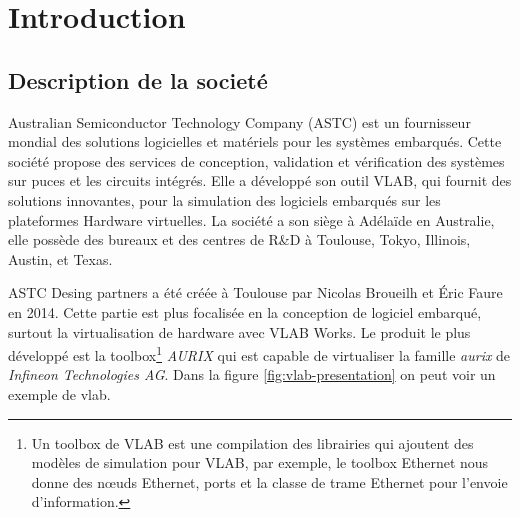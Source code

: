 \section{Introduction}

\subsection{Description de la societ\'e}
Australian Semiconductor Technology Company (ASTC) est un fournisseur mondial des solutions logicielles et matériels pour les systèmes embarqués. Cette société propose des services de conception, validation et vérification des systèmes sur puces et les circuits intégrés. Elle a développé son outil VLAB, qui fournit des solutions innovantes, pour la simulation des logiciels embarqués sur les plateformes Hardware virtuelles. La société a son siège à Adélaïde en Australie, elle possède des bureaux et des centres de R\&D à Toulouse, Tokyo, Illinois, Austin, et Texas.  

ASTC Desing partners a été créée à Toulouse par Nicolas Broueilh et Éric Faure en 2014. Cette partie est plus focalis\'ee en la conception de logiciel embarqué, surtout la virtualisation de hardware avec VLAB Works. Le produit le plus développé est la toolbox\footnote{Un toolbox de VLAB est une compilation des librairies qui ajoutent des modèles de simulation pour VLAB, par exemple, le toolbox Ethernet nous donne des nœuds Ethernet, ports et la classe de trame Ethernet pour l'envoie d'information.} \textit{AURIX} qui est capable de virtualiser la famille \textit{aurix} de \textit{Infineon Technologies AG}. Dans la figure \ref{fig:vlab-presentation} on peut voir un exemple de vlab. 

